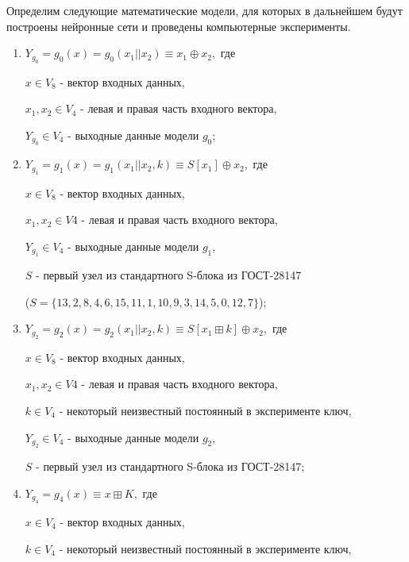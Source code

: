\bigskip
Определим следующие математические модели, для которых в дальнейшем будут построены нейронные сети и проведены компьютерные эксперименты.
\bigskip
\begin{enumerate}
	\item
	$Y_{g_0} = g_0(x) = g_0(x_1 || x_2)\equiv x_1 \oplus x_2,$ где
	
	$x \in V_{8}$ - вектор входных данных,
	
	$x_1, x_2 \in V_{4}$ - левая и правая часть входного вектора,
	
	$Y_{g_0} \in V_{4}$ - выходные данные модели $g_0$;
	\bigskip
	
	\item
	$Y_{g_1} = g_1(x) = g_1(x_1 || x_2, k) \equiv S[x_1] \oplus x_2,$ где
	
	$x \in V_{8}$ - вектор входных данных,
	
	$x_1, x_2 \in V{4}$ - левая и правая часть входного вектора,
	
	$Y_{g_1} \in V_{4}$ - выходные данные модели $g_1$,
	
	$S$ - первый узел из стандартного S-блока из ГОСТ-28147 
	
	($ S = \{13, 2, 8, 4, 6, 15, 11, 1, 10, 9, 3, 14, 5, 0, 12, 7\}$);
	\bigskip
	
	\item
	$Y_{g_2} = g_2(x) = g_2(x_1 || x_2, k) \equiv S[x_1 \boxplus k] \oplus x_2,$ где
	
	$x \in V_{8}$ - вектор входных данных,
	
	$x_1, x_2 \in V{4}$ - левая и правая часть входного вектора,
	
	$k \in V_{4}$ - некоторый неизвестный постоянный в эксперименте ключ,
	
	$Y_{g_2} \in V_{4}$ - выходные данные модели $g_2$,
	
	$S$ - первый узел из стандартного S-блока из ГОСТ-28147;
	
	\item
	$Y_{g_4} = g_4(x) \equiv x \boxplus K,$ где
	
	$x \in V_{4}$ - вектор входных данных,
	
	$k \in V_{4}$ - некоторый неизвестный постоянный в эксперименте ключ,
	

\end{enumerate}
